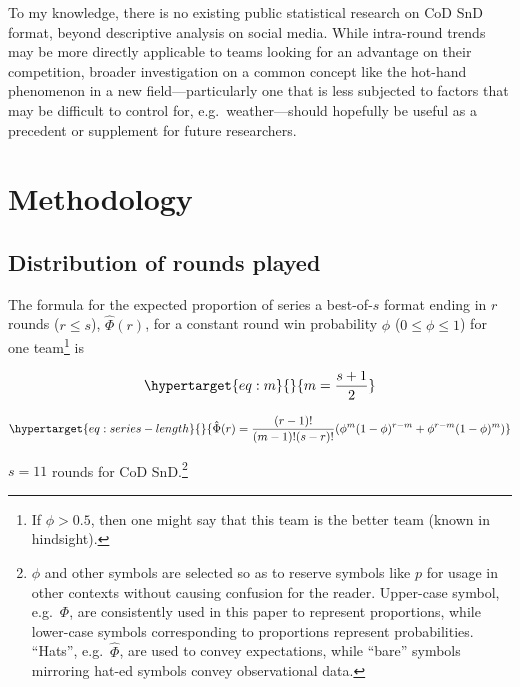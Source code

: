 \documentclass{article}
\begin{document}
To my knowledge, there is no existing public statistical research on CoD
SnD format, beyond descriptive analysis on social media. While
intra-round trends may be more directly applicable to teams looking for
an advantage on their competition, broader investigation on a common
concept like the hot-hand phenomenon in a new field---particularly one
that is less subjected to factors that may be difficult to control for,
e.g.~weather---should hopefully be useful as a precedent or supplement
for future researchers.

\hypertarget{methodology}{%
\section{Methodology}\label{methodology}}

\hypertarget{distribution-of-rounds-played}{%
\subsection{Distribution of rounds
played}\label{distribution-of-rounds-played}}

The formula for the expected proportion of series a best-of-\(s\) format
ending in \(r\) rounds (\(r \leq s\)), \(\hat{\Phi}(r)\), for a constant
round win probability \(\phi\) (\(0 \leq \phi \leq 1\)) for one
team\footnote{If \(\phi > 0.5\), then one might say that this team is
  the better team (known in hindsight).} is

\begin{equation}\protect\hypertarget{eq:m}{}{
m = \frac{s + 1}{2}
}\label{eq:m}\end{equation}

\begin{equation}\protect\hypertarget{eq:series-length}{}{
\hat{\Phi}(r) = \frac{(r - 1)!}{(m - 1)!(s - r)!}(\phi^{m}(1 - \phi)^{r - m} + \phi^{r - m}(1 - \phi)^m)
}\label{eq:series-length}\end{equation}

\(s = 11\) rounds for CoD SnD.\footnote{\(\phi\) and other symbols are
  selected so as to reserve symbols like \(p\) for usage in other
  contexts without causing confusion for the reader. Upper-case symbol,
  e.g.~\(\Phi\), are consistently used in this paper to represent
  proportions, while lower-case symbols corresponding to proportions
  represent probabilities. ``Hats'', e.g.~\(\hat{\Phi}\), are used to
  convey expectations, while ``bare'' symbols mirroring hat-ed symbols
  convey observational data.}
\end{document}
